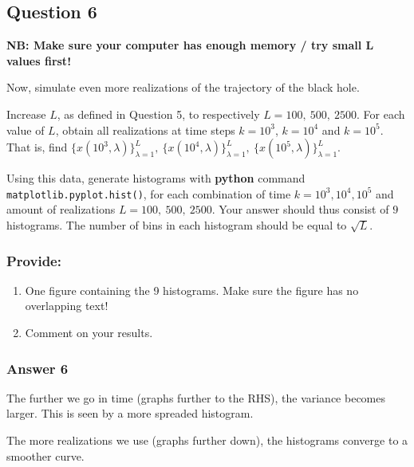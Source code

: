 \documentclass[11pt]{article}
\providecommand{\tightlist}{%
      \setlength{\itemsep}{0pt}\setlength{\parskip}{0pt}}
\begin{document}
    \hypertarget{question-6}{%
\subsection{Question 6}\label{question-6}}

\textbf{NB: Make sure your computer has enough memory / try small L
values first!}

Now, simulate even more realizations of the trajectory of the black
hole.

Increase \(L\), as defined in Question 5, to respectively
\(L = 100, \ 500, \ 2500\). For each value of \(L\), obtain all
realizations at time steps \(k = 10^3\), \(k = 10^4\) and \(k = 10^5\).
That is, find
\(\{x(10^3,\lambda)\}_{\lambda = 1}^L, \ \{x(10^4,\lambda)\}_{\lambda = 1}^L, \ \{x(10^5,\lambda)\}_{\lambda = 1}^L\).

Using this data, generate histograms with \textbf{python} command
\texttt{matplotlib.pyplot.hist()}, for each combination of time
\(k = 10^3,10^4,10^5\) and amount of realizations
\(L = 100, \ 500, \ 2500\). Your answer should thus consist of \(9\)
histograms. The number of bins in each histogram should be equal to
\(\sqrt{L}\).

\hypertarget{provide}{%
\subsubsection{Provide:}\label{provide}}

\begin{enumerate}
\def\labelenumi{\arabic{enumi}.}
\tightlist
\item
  One figure containing the 9 histograms. Make sure the figure has no
  overlapping text!
\item
  Comment on your results.
\end{enumerate}

    \hypertarget{answer-6}{%
\subsubsection{Answer 6}\label{answer-6}}

The further we go in time (graphs further to the RHS), the variance
becomes larger. This is seen by a more spreaded histogram.

The more realizations we use (graphs further down), the histograms
converge to a smoother curve.
\end{document}
